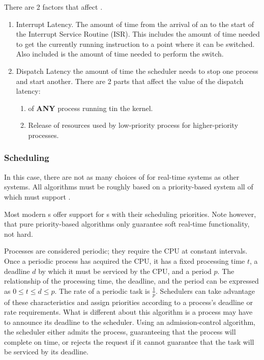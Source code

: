 There are 2 factors that affect .
\begin{enumerate}[noitemsep]
\item Interrupt Latency.
  The amount of time from the arrival of an  to the start of the Interrupt Service Routine (ISR).
  This includes the amount of time needed to get the currently running instruction to a point where it can be switched.
  Also included is the amount of time needed to perform the switch.
\item Dispatch Latency the amount of time the scheduler needs to stop one process and start another.
  There are 2 parts that affect the value of the dispatch latency:
  \begin{enumerate}[noitemsep]
  \item {} of \textbf{ANY} process running tin the kernel.
  \item Release of resources used by low-priority process for higher-priority processes.
  \end{enumerate}
\end{enumerate}

\subsubsection{Scheduling}\label{subsubsec:Real_Time_Scheduling}
In this case, there are not as many choices of  for real-time systems as other systems.
All algorithms must be roughly based on a priority-based system all of which must support .

Most modern s offer support for s with their scheduling priorities.
Note however, that pure priority-based algorithms only guarantee soft real-time functionality, not hard.

Processes are considered periodic; they require the CPU at constant intervals.
Once a periodic process has acquired the CPU, it has a fixed processing time $t$, a deadline $d$ by which it must be serviced by the CPU, and a period $p$.
The relationship of the processing time, the deadline, and the period can be expressed as $0 \leq t \leq d \leq p$.
The rate of a periodic task is $\frac{1}{p}$.
Schedulers can take advantage of these characteristics and assign priorities according to a process’s deadline or rate requirements.
What is different about this algorithm is a process may have to announce its deadline to the scheduler.
Using an admission-control algorithm, the scheduler either admits the process, guaranteeing that the process will complete on time, or rejects the request if it cannot guarantee that the task will be serviced by its deadline.

